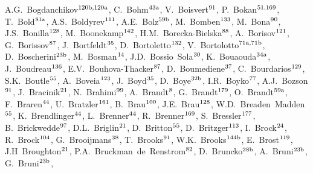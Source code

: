 \begin{flushleft}
A.G.~Bogdanchikov$^\textrm{\scriptsize 120b,120a}$,    
C.~Bohm$^\textrm{\scriptsize 43a}$,    
V.~Boisvert$^\textrm{\scriptsize 91}$,    
P.~Bokan$^\textrm{\scriptsize 51,169}$,    
T.~Bold$^\textrm{\scriptsize 81a}$,    
A.S.~Boldyrev$^\textrm{\scriptsize 111}$,    
A.E.~Bolz$^\textrm{\scriptsize 59b}$,    
M.~Bomben$^\textrm{\scriptsize 133}$,    
M.~Bona$^\textrm{\scriptsize 90}$,    
J.S.~Bonilla$^\textrm{\scriptsize 128}$,    
M.~Boonekamp$^\textrm{\scriptsize 142}$,    
H.M.~Borecka-Bielska$^\textrm{\scriptsize 88}$,    
A.~Borisov$^\textrm{\scriptsize 121}$,    
G.~Borissov$^\textrm{\scriptsize 87}$,    
J.~Bortfeldt$^\textrm{\scriptsize 35}$,    
D.~Bortoletto$^\textrm{\scriptsize 132}$,    
V.~Bortolotto$^\textrm{\scriptsize 71a,71b}$,    
D.~Boscherini$^\textrm{\scriptsize 23b}$,    
M.~Bosman$^\textrm{\scriptsize 14}$,    
J.D.~Bossio~Sola$^\textrm{\scriptsize 30}$,    
K.~Bouaouda$^\textrm{\scriptsize 34a}$,    
J.~Boudreau$^\textrm{\scriptsize 136}$,    
E.V.~Bouhova-Thacker$^\textrm{\scriptsize 87}$,    
D.~Boumediene$^\textrm{\scriptsize 37}$,    
C.~Bourdarios$^\textrm{\scriptsize 129}$,    
S.K.~Boutle$^\textrm{\scriptsize 55}$,    
A.~Boveia$^\textrm{\scriptsize 123}$,    
J.~Boyd$^\textrm{\scriptsize 35}$,    
D.~Boye$^\textrm{\scriptsize 32b}$,    
I.R.~Boyko$^\textrm{\scriptsize 77}$,    
A.J.~Bozson$^\textrm{\scriptsize 91}$,    
J.~Bracinik$^\textrm{\scriptsize 21}$,    
N.~Brahimi$^\textrm{\scriptsize 99}$,    
A.~Brandt$^\textrm{\scriptsize 8}$,    
G.~Brandt$^\textrm{\scriptsize 179}$,    
O.~Brandt$^\textrm{\scriptsize 59a}$,    
F.~Braren$^\textrm{\scriptsize 44}$,    
U.~Bratzler$^\textrm{\scriptsize 161}$,    
B.~Brau$^\textrm{\scriptsize 100}$,    
J.E.~Brau$^\textrm{\scriptsize 128}$,    
W.D.~Breaden~Madden$^\textrm{\scriptsize 55}$,    
K.~Brendlinger$^\textrm{\scriptsize 44}$,    
L.~Brenner$^\textrm{\scriptsize 44}$,    
R.~Brenner$^\textrm{\scriptsize 169}$,    
S.~Bressler$^\textrm{\scriptsize 177}$,    
B.~Brickwedde$^\textrm{\scriptsize 97}$,    
D.L.~Briglin$^\textrm{\scriptsize 21}$,    
D.~Britton$^\textrm{\scriptsize 55}$,    
D.~Britzger$^\textrm{\scriptsize 113}$,    
I.~Brock$^\textrm{\scriptsize 24}$,    
R.~Brock$^\textrm{\scriptsize 104}$,    
G.~Brooijmans$^\textrm{\scriptsize 38}$,    
T.~Brooks$^\textrm{\scriptsize 91}$,    
W.K.~Brooks$^\textrm{\scriptsize 144b}$,    
E.~Brost$^\textrm{\scriptsize 119}$,    
J.H~Broughton$^\textrm{\scriptsize 21}$,    
P.A.~Bruckman~de~Renstrom$^\textrm{\scriptsize 82}$,    
D.~Bruncko$^\textrm{\scriptsize 28b}$,    
A.~Bruni$^\textrm{\scriptsize 23b}$,    
G.~Bruni$^\textrm{\scriptsize 23b}$,    

\end{flushleft}
